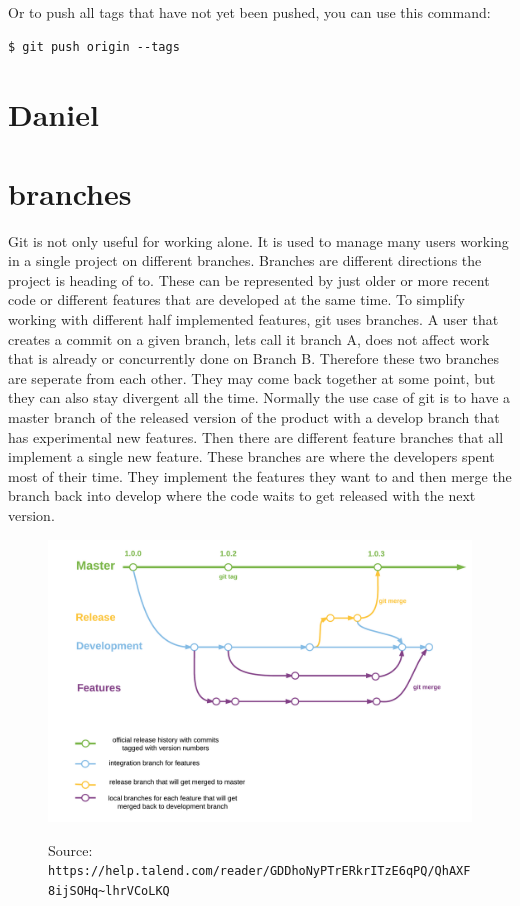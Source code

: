 \documentclass[a4paper, 12pt]{article}
\begin{document}
		Or to push all tags that have not yet been pushed, you can use this command:
		
		\begin{lstlisting}
$ git push origin --tags
		\end{lstlisting}
		\newpage
		
	\section{Daniel}
			
	\section{branches}
	
		Git is not only useful for working alone. It is used to manage many users working in a single project on different branches. Branches are different directions the project is heading of to. These can be represented by just older or more recent code or different features that are developed at the same time. To simplify working with different half implemented features, git uses branches. A user that creates a commit on a given branch, lets call it branch A, does not affect work that is already or concurrently done on Branch B. Therefore these two branches are seperate from each other. They may come back together at some point, but they can also stay divergent all the time. Normally the use case of git is to have a master branch of the released version of the product with a develop branch that has experimental new features. Then there are different feature branches that all implement a single new feature. These branches are where the developers spent most of their time. They implement the features they want to and then merge the branch back into develop where the code waits to get released with the next version.
		
		\begin{figure}[h]
			\centering
			\includegraphics[width=.725\linewidth]{gitbranches.png}
			\label{fig1}
			\caption{Source: \newline\lstinline|https://help.talend.com/reader/GDDhoNyPTrERkrITzE6qPQ/QhAXF8ijSOHq~lhrVCoLKQ|}
		\end{figure}
		
\end{document}
